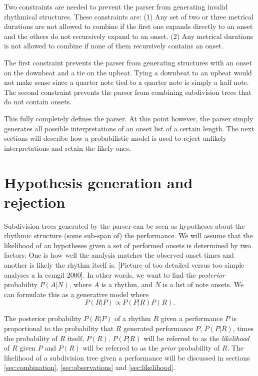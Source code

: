 Two constraints are needed to prevent the parser from generating invalid rhythmical structures. These constraints are: (1) Any set of two or three metrical durations are not allowed to combine if the first one expands directly to an onset and the others do not recursively expand to an onset. (2) Any metrical durations is not allowed to combine if none of them recursively contains an onset.

The first constraint prevents the parser from generating structures with an onset on the downbeat and a tie on the upbeat. Tying a downbeat to an upbeat would not make sense since a quarter note tied to a quarter note is simply a half note. The second constraint prevents the parser from combining subdivision trees that do not contain onsets.

This fully completely defines the parser. At this point however, the parser simply generates all possible interpretations of an onset list of a certain length. The next sections will describe how a probabilistic model is used to reject unlikely interpretations and retain the likely ones.

\section{Hypothesis generation and rejection}
\label{sec:rejection}

Subdivision trees generated by the parser can be seen as hypotheses about the rhythmic structure (some sub-span of) the performance. We will assume that the likelihood of an hypotheses given a set of performed onsets is determined by two factors: One is how well the analysis matches the observed onset times and another is likely the rhythm itself is. [Picture of too detailed versus too simple analyses a la cemgil 2000]. In other words, we want to find the \textit{posterior} probability $P(A|N)$, where $A$ is a rhythm, and $N$ is a list of note onsets. We can formulate this as a generative model where
\begin{equation}
\label{eq:model}
P(R|P) \propto P(P|R)P(R).
\end{equation}

The posterior probability $P(R|P)$ of a rhythm $R$ given a performance $P$ is proportional to the probability that $R$ generated performance $P$, $P(P|R)$, times the probability of $R$ itself, $P(R)$. $P(P|R)$ will be referred to as the \textit{likelihood} of $R$ given $P$ and $P(R)$ will be referred to as the \textit{prior} probability of $R$. The likelihood of a subdivision tree given a performance will be discussed in sections \ref{sec:combination}, \ref{sec:observations} and \ref{sec:likelihood}. 

